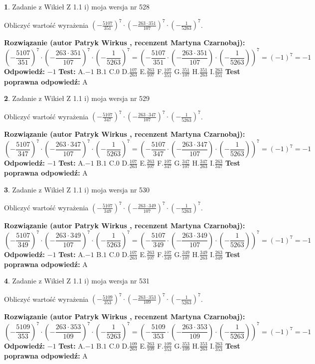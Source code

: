 \documentclass[12pt, a4paper]{article}
\theoremstyle{definition} %
\newtheorem{zad}{}
\newcommand{\zadStart}[1]{\begin{zad}#1\newline}
\newcommand{\zadStop}{\end{zad}}
\newcommand{\rozwStart}[2]{\noindent \textbf{Rozwiązanie (autor #1 , recenzent #2): }\newline}
\newcommand{\rozwStop}{\newline}
\newcommand{\odpStart}{\noindent \textbf{Odpowiedź:}\newline}
\newcommand{\odpStop}{\newline}
\newcommand{\testStart}{\noindent \textbf{Test:}\newline}
\newcommand{\testStop}{\newline}
\newcommand{\kluczStart}{\noindent \textbf{Test poprawna odpowiedź:}\newline}
\newcommand{\kluczStop}{\newline}
\begin{document}
\zadStart{Zadanie z Wikieł Z 1.1 i) moja wersja nr 528}

Obliczyć wartość wyrażenia $(-\frac{5107}{351})^{7} \cdot (-\frac{263 \cdot 351}{107})^{7} \cdot (-\frac{1}{5263})^{7}$.
\zadStop
\rozwStart{Patryk Wirkus}{Martyna Czarnobaj}
$$(-\frac{5107}{351})^{7} \cdot (-\frac{263 \cdot 351}{107})^{7} \cdot (-\frac{1}{5263})^{7} = (-\frac{5107}{351} \cdot (-\frac{263 \cdot 351}{107}) \cdot (-\frac{1}{5263}))^{7} = (-1)^{7} = -1$$
\rozwStop
\odpStart
$-1$
\odpStop
\testStart
A.$-1$ B.$1$ C.$0$ D.$\frac{107}{263}$ E.$\frac{263}{107}$
F.$\frac{107}{351}$ G.$\frac{351}{107}$
H.$\frac{351}{263}$
I.$\frac{263}{351}$
\testStop
\kluczStart
A
\kluczStop



\zadStart{Zadanie z Wikieł Z 1.1 i) moja wersja nr 529}

Obliczyć wartość wyrażenia $(-\frac{5107}{347})^{7} \cdot (-\frac{263 \cdot 347}{107})^{7} \cdot (-\frac{1}{5263})^{7}$.
\zadStop
\rozwStart{Patryk Wirkus}{Martyna Czarnobaj}
$$(-\frac{5107}{347})^{7} \cdot (-\frac{263 \cdot 347}{107})^{7} \cdot (-\frac{1}{5263})^{7} = (-\frac{5107}{347} \cdot (-\frac{263 \cdot 347}{107}) \cdot (-\frac{1}{5263}))^{7} = (-1)^{7} = -1$$
\rozwStop
\odpStart
$-1$
\odpStop
\testStart
A.$-1$ B.$1$ C.$0$ D.$\frac{107}{263}$ E.$\frac{263}{107}$
F.$\frac{107}{347}$ G.$\frac{347}{107}$
H.$\frac{347}{263}$
I.$\frac{263}{347}$
\testStop
\kluczStart
A
\kluczStop



\zadStart{Zadanie z Wikieł Z 1.1 i) moja wersja nr 530}

Obliczyć wartość wyrażenia $(-\frac{5107}{349})^{7} \cdot (-\frac{263 \cdot 349}{107})^{7} \cdot (-\frac{1}{5263})^{7}$.
\zadStop
\rozwStart{Patryk Wirkus}{Martyna Czarnobaj}
$$(-\frac{5107}{349})^{7} \cdot (-\frac{263 \cdot 349}{107})^{7} \cdot (-\frac{1}{5263})^{7} = (-\frac{5107}{349} \cdot (-\frac{263 \cdot 349}{107}) \cdot (-\frac{1}{5263}))^{7} = (-1)^{7} = -1$$
\rozwStop
\odpStart
$-1$
\odpStop
\testStart
A.$-1$ B.$1$ C.$0$ D.$\frac{107}{263}$ E.$\frac{263}{107}$
F.$\frac{107}{349}$ G.$\frac{349}{107}$
H.$\frac{349}{263}$
I.$\frac{263}{349}$
\testStop
\kluczStart
A
\kluczStop



\zadStart{Zadanie z Wikieł Z 1.1 i) moja wersja nr 531}

Obliczyć wartość wyrażenia $(-\frac{5109}{353})^{7} \cdot (-\frac{263 \cdot 353}{109})^{7} \cdot (-\frac{1}{5263})^{7}$.
\zadStop
\rozwStart{Patryk Wirkus}{Martyna Czarnobaj}
$$(-\frac{5109}{353})^{7} \cdot (-\frac{263 \cdot 353}{109})^{7} \cdot (-\frac{1}{5263})^{7} = (-\frac{5109}{353} \cdot (-\frac{263 \cdot 353}{109}) \cdot (-\frac{1}{5263}))^{7} = (-1)^{7} = -1$$
\rozwStop
\odpStart
$-1$
\odpStop
\testStart
A.$-1$ B.$1$ C.$0$ D.$\frac{109}{263}$ E.$\frac{263}{109}$
F.$\frac{109}{353}$ G.$\frac{353}{109}$
H.$\frac{353}{263}$
I.$\frac{263}{353}$
\testStop
\kluczStart
A
\kluczStop
\end{document}
